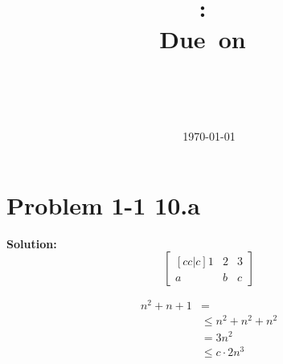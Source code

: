 \documentclass[12pt,a4paper]{article}
\title{
	\vspace{2in}
	\textmd{\textbf{\hwClass:\ \hwTitle}}\\
	\normalsize\vspace{0.1in}\small{Due\ on\ \hwDueDate}\\
	\vspace{0.1in}\large{\textit{\hwClassInstructor\ \hwClassTime}}
	\vspace{3in}
}
\author{
	\textbf{\hwAuthorName}\\
	\small{\hwAuthorID}
}
\date{\today}
\newenvironment{problem}[1]{\section*{Problem #1}}{}
\newenvironment{solution}{
	\vspace{0.2in}
	\setlength\parindent{0pt}\textbf{Solution:}\\
}{
	\vspace{0.2in}
}
\begin{document}
\clearpage\maketitle
\thispagestyle{empty}
\newpage
\setcounter{page}{1}

\begin{problem}{1-1 10.a}
	\lipsum[1]
	\begin{solution}
		$$
		\begin{bmatrix}[cc|c]
			1 & 2 & 3 \\  a & b & c
		\end{bmatrix}
		$$
	\end{solution}
	\[
        \begin{split}
            n^2 + n + 1 &=
            \\
            &\leq n^2 + n^2 + n^2
            \\
            &= 3n^2
            \\
            &\leq c \cdot 2n^3
        \end{split}
	\]
\end{problem}
\end{document}
